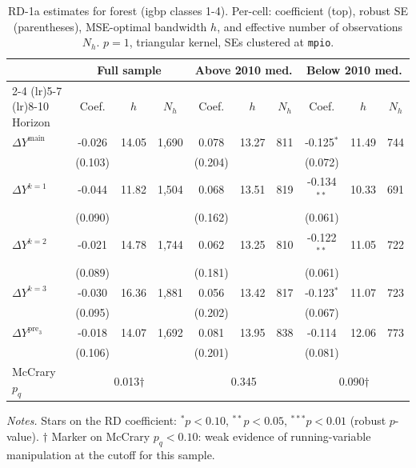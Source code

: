 \documentclass[11pt]{article}
\begin{document}
\begin{table}[H]
\centering
\scriptsize
\caption{RD-1a estimates for forest (igbp classes 1-4). Per-cell: coefficient
(top), robust SE (parentheses), MSE-optimal bandwidth $h$, and
effective number of observations $N_h$. $p=1$, triangular kernel,
SEs clustered at \texttt{mpio}.}
\label{tab:rdplot_rd1a_forest}
\begin{tabular}{l ccc ccc ccc}
\toprule
 & \multicolumn{3}{c}{Full sample} & \multicolumn{3}{c}{Above 2010 med.} & \multicolumn{3}{c}{Below 2010 med.} \\
\cmidrule(lr){2-4} \cmidrule(lr){5-7} \cmidrule(lr){8-10}
Horizon & Coef. & $h$ & $N_h$ & Coef. & $h$ & $N_h$ & Coef. & $h$ & $N_h$ \\
\midrule
$\Delta Y^{\text{main}}$ & -0.026 & 14.05 & 1,690 & 0.078 & 13.27 & 811 & -0.125$^{*}$ & 11.49 & 744 \\
 & (0.103) &  &  & (0.204) &  &  & (0.072) &  &  \\
\addlinespace[1pt]
$\Delta Y^{k=1}$ & -0.044 & 11.82 & 1,504 & 0.068 & 13.51 & 819 & -0.134$^{**}$ & 10.33 & 691 \\
 & (0.090) &  &  & (0.162) &  &  & (0.061) &  &  \\
\addlinespace[1pt]
$\Delta Y^{k=2}$ & -0.021 & 14.78 & 1,744 & 0.062 & 13.25 & 810 & -0.122$^{**}$ & 11.05 & 722 \\
 & (0.089) &  &  & (0.181) &  &  & (0.061) &  &  \\
\addlinespace[1pt]
$\Delta Y^{k=3}$ & -0.030 & 16.36 & 1,881 & 0.056 & 13.42 & 817 & -0.123$^{*}$ & 11.07 & 723 \\
 & (0.095) &  &  & (0.202) &  &  & (0.067) &  &  \\
\addlinespace[1pt]
$\Delta Y^{\text{pre}_3}$ & -0.018 & 14.07 & 1,692 & 0.081 & 13.95 & 838 & -0.114 & 12.06 & 773 \\
 & (0.106) &  &  & (0.201) &  &  & (0.081) &  &  \\
\addlinespace[1pt]
\midrule
McCrary $p_q$ & \multicolumn{3}{c}{0.013$\dagger$} & \multicolumn{3}{c}{0.345} & \multicolumn{3}{c}{0.090$\dagger$} \\
\bottomrule
\end{tabular}
\begin{flushleft}\footnotesize
\textit{Notes.} Stars on the RD coefficient: $^{*}p<0.10$,
$^{**}p<0.05$, $^{***}p<0.01$ (robust $p$-value).
$\dagger$ Marker on McCrary $p_q<0.10$: weak evidence of running-variable manipulation at the cutoff for this sample.\\
\end{flushleft}
\end{table}
\end{document}
